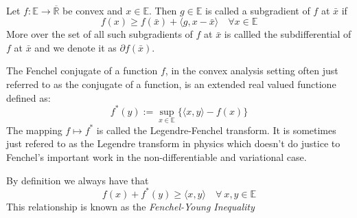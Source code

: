 %
\begin{definition}
\autocite{notes}\\
	Let $f: \mathbb E \longrightarrow \overline{\mathbb R}$ be convex and 
	$x\in\mathbb E$. Then $g\in\mathbb E$ is called a subgradient of $f$ at
	$\bar x$ if 
	\begin{equation*}
		f(x) \geq f(\bar x) +\langle g,x-\bar x\rangle \quad 
		\forall x\in\mathbb E 
	\end{equation*}
More over the set of all such subgradients of $f$ at $\bar x$ is callled the subdifferential
of $f$ at $\bar x$ and we denote it as $\partial f(\bar x)$.
\end{definition}
%
\begin{definition}
The Fenchel conjugate of a function $f$, in the convex analysis setting often
just referred to as the conjugate of a function, is an extended real valued
functione defined as:
\begin{equation*}
	f^*(y) := \sup_{x\in\mathbb E}\{\langle x,y\rangle - f(x)\}
\end{equation*}
The mapping $f\mapsto f^*$ is called the Legendre-Fenchel transform.
It is sometimes just refered to as the Legendre transform in physics which 
doesn't do justice to Fenchel's important work in the non-differentiable
and variational case.
\end{definition}
\noindent By definition we always have that
\begin{equation*} f(x)+f^*(y)\geq\langle x,y\rangle \quad \forall\ x,y\in 
\mathbb E\end{equation*}
This relationship is known as the \emph{Fenchel-Young Inequality}

